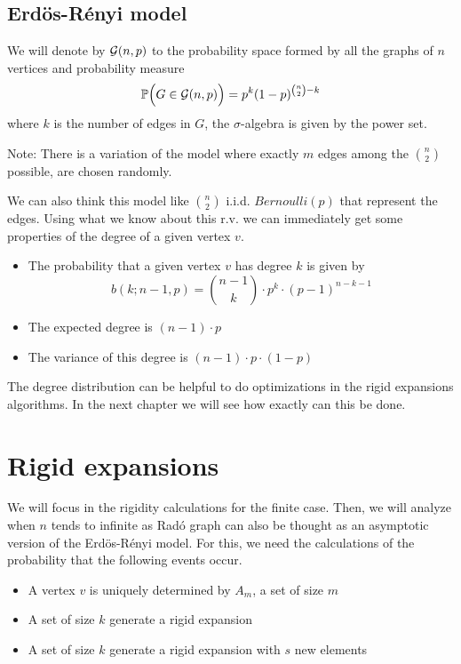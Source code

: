 \subsection{Erdös-Rényi model}
\begin{defini}
We will denote by $\mathcal{G}(n,p)$ to the probability space formed by all the graphs of $n$ vertices and probability measure 
$$ \mathbb{P}\Big(G\in \mathcal{G}(n,p)\Big) = p^{k} (1-p)^{\binom{n}{2}-k} $$
where $k$ is the number of edges in $G$, the $\sigma$-algebra is given by the power set.
\end{defini}

Note: There is a variation of the model where exactly $m$ edges among the $\binom{n}{2}$ possible, are chosen randomly.

We can also think this model like $\binom{n}{2}$ i.i.d. $Bernoulli(p)$ that represent the edges. Using what we know about this r.v. we can immediately get some properties of the degree of a given vertex $v$.

\begin{itemize}
\item The probability that a given vertex $v$ has degree $k$ is given by
$$b(k; n-1,p) = \binom{n-1}{k} \cdot p^{k} \cdot (p-1)^{n-k-1}$$
\item The expected degree is $(n-1)\cdot p$
\item The variance of this degree is $(n-1)\cdot p \cdot (1-p)$
\end{itemize}

The degree distribution can be helpful to do optimizations in the rigid expansions algorithms. In the next chapter we will see how exactly can this be done.

\section{Rigid expansions}

 We will focus in the rigidity calculations for the finite case. Then, we will analyze when $n$ tends to infinite as Radó graph can also be thought as an asymptotic version of the Erdös-Rényi model. For this, we need the calculations of the probability that the following events occur.

\begin{itemize}
\item A vertex $v$ is uniquely determined by $A_{m}$, a set of size $m$
\item A set of size $k$ generate a rigid expansion
\item A set of size $k$ generate a rigid expansion with $s$ new elements
\end{itemize}
\clearpage

